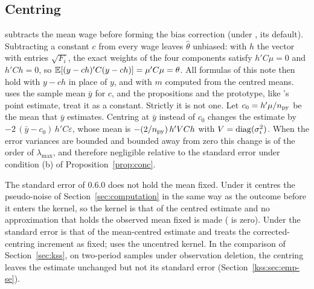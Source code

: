 \subsection{Centring}\label{sec:centring}

\fevc{} subtracts the mean wage before forming the bias correction (under , its default).
Subtracting a constant $c$ from every wage leaves $\hat\theta$ unbiased: with $h$ the vector with entries
$\sqrt{F_i}$, the exact weights of the four components satisfy $h'C\mu=0$ and $h'Ch=0$, so
$\mathbb{E}[(y-ch)'C(y-ch)]=\mu'C\mu=\theta$. All formulas of this note then hold with $y-ch$ in place of $y$, and with $m$
computed from the centred means. \fevc{} uses the sample mean $\bar y$ for $c$, and the propositions and the
prototype, like \fevc's point estimate, treat it as a constant. Strictly it is not one. Let $c_0=h'\mu/n_{\rm py}$
be the mean that $\bar y$ estimates. Centring at $\bar y$ instead of $c_0$ changes the estimate by
$-2\,(\bar y-c_0)\,h'C\varepsilon$, whose mean is $-(2/n_{\rm py})\,h'VCh$ with $V=\operatorname{diag}(\sigma_i^2)$. When
the error variances are bounded and bounded away from zero this change is of the order of $\lambda_{\max}$, and
therefore negligible relative to the standard error under condition (b) of Proposition~\ref{prop:conc}.

The standard error of \fevc{} 0.6.0 does not hold the mean fixed. Under  it centres the
pseudo-noise of Section~\ref{sec:computation} in the same way as the outcome before it enters the kernel, so the
kernel is that of the centred estimate and no approximation that holds the observed mean fixed is made
( is zero). Under  the standard error is that of the
mean-centred estimate and treats the corrected-centring increment as fixed;  uses the
uncentred kernel. In the comparison of Section~\ref{sec:kss}, on two-period samples under observation deletion,
the centring leaves the estimate unchanged but not its standard error (Section~\ref{kss:sec:emp-se}).
